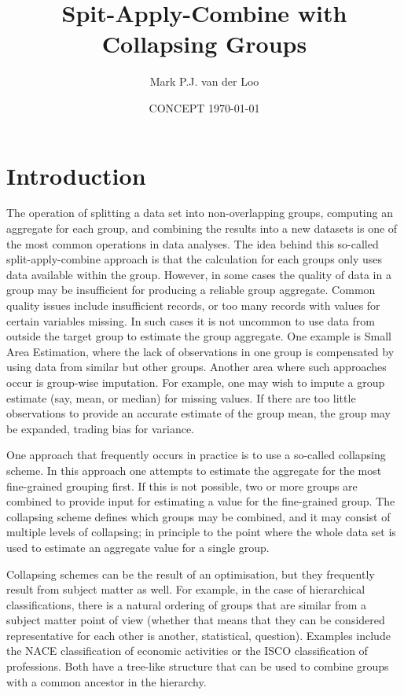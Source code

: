 \documentclass[11pt, fleqn]{article}
\title{Spit-Apply-Combine with Collapsing Groups}
\author{Mark P.J. van der Loo}
\date{CONCEPT \today{}}
\begin{document}
\maketitle

\section{Introduction}
The operation of splitting a data set into non-overlapping groups, computing an
aggregate for each group, and combining the results into a new datasets is one
of the most common operations in data analyses. The idea behind this so-called
split-apply-combine approach is that the calculation for each groups only uses
data available within the group. However, in some cases the quality of data in
a group may be insufficient for producing a reliable group aggregate. Common
quality issues include insufficient records, or too many records with values
for certain variables missing. In such cases it is not uncommon to use data
from outside the target group  to estimate the group aggregate. One example is
Small Area Estimation, where the lack of observations in one group is
compensated by using data from similar but other groups. Another area where
such approaches occur is group-wise imputation. For example, one may wish to
impute a group estimate (say, mean, or median) for missing values. If there are
too little observations to provide an accurate estimate of the group mean, the
group may be expanded, trading bias for variance.

One approach that frequently occurs in practice is to use a so-called
collapsing scheme. In this approach one attempts to estimate the aggregate for
the most fine-grained grouping first.  If this is not possible, two or more
groups are combined to provide input for estimating a value for the
fine-grained group. The collapsing scheme defines which groups may be combined,
and it may consist of multiple levels of collapsing; in principle to the point
where the whole data set is used to estimate an aggregate value for a single
group.

Collapsing schemes can be the result of an optimisation, but they frequently
result from subject matter as well. For example, in the case of hierarchical
classifications, there is a natural ordering of groups that are similar from a
subject matter point of view (whether that means that they can be considered
representative for each other is another, statistical, question).  Examples
include the NACE classification of economic activities or the ISCO
classification of professions. Both have a tree-like structure that can be used
to combine groups with a common ancestor in the hierarchy.
\end{document}
